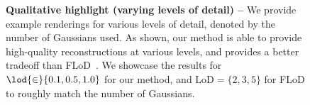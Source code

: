 \begin{figure}
  \centering
  \clogqualitativefig
  \caption[Qualitative results of \clog under varying levels of detail (LoD)]{
    \textbf{Qualitative highlight (varying levels of detail) --}
    We provide example renderings for various levels of detail, denoted by the
    number of Gaussians used.
    As shown, our method is able to provide high-quality reconstructions at
    various levels, and provides a better tradeoff than FLoD~\cite{seo2024flod}.
    We showcase the results for $\lod{\in}\{0.1, 0.5, 1.0\}$ for our method, and
    $\text{LoD}{=}\{2,3,5\}$ for FLoD to roughly match the number of Gaussians.
  }
  \label{fig:clog-level-of-details}
\end{figure}